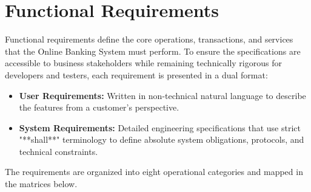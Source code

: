 \documentclass[11pt,a4paper]{article}
\begin{document}
\newpage

\section{Functional Requirements}
Functional requirements define the core operations, transactions, and services that the Online Banking System must perform. To ensure the specifications are accessible to business stakeholders while remaining technically rigorous for developers and testers, each requirement is presented in a dual format:
\begin{itemize}
    \item \textbf{User Requirements:} Written in non-technical natural language to describe the features from a customer's perspective.
    \item \textbf{System Requirements:} Detailed engineering specifications that use strict "**shall**" terminology to define absolute system obligations, protocols, and technical constraints.
\end{itemize}
The requirements are organized into eight operational categories and mapped in the matrices below.
\end{document}
